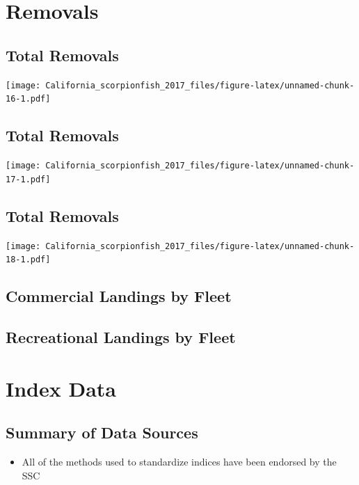\documentclass[ignorenonframetext,compress]{beamer}
\providecommand{\tightlist}{%
\setlength{\itemsep}{0pt}\setlength{\parskip}{0pt}}
\begin{document}
\section{Removals}\label{removals}

\subsection{Total Removals}\label{total-removals}

\centering
\texttt{[image: California\_scorpionfish\_2017\_files/figure-latex/unnamed-chunk-16-1.pdf]}

\subsection{Total Removals}\label{total-removals-1}

\texttt{[image: California\_scorpionfish\_2017\_files/figure-latex/unnamed-chunk-17-1.pdf]}

\subsection{Total Removals}\label{total-removals-2}

\texttt{[image: California\_scorpionfish\_2017\_files/figure-latex/unnamed-chunk-18-1.pdf]}

\subsection{Commercial Landings by
Fleet}\label{commercial-landings-by-fleet}

\subsection{Recreational Landings by
Fleet}\label{recreational-landings-by-fleet}

\section{Index Data}\label{index-data}

\subsection{Summary of Data Sources}\label{summary-of-data-sources}

\begin{itemize}
\tightlist
\item
  All of the methods used to standardize indices have been endorsed by
  the SSC
\end{itemize}
\end{document}

